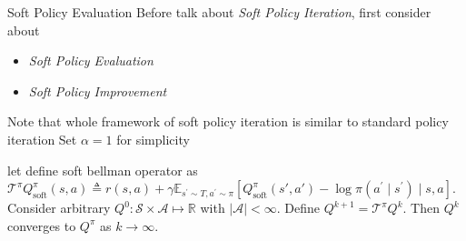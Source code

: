 \documentclass[8pt]{beamer}
\begin{document}
\begin{frame}{Soft Policy Evaluation}
    Before talk about \textit{Soft Policy Iteration}, first consider  about 
    \begin{itemize}
        \item \textit{Soft Policy Evaluation}
        \item \textit{Soft Policy Improvement}
    \end{itemize}
    Note that whole framework of soft policy iteration is similar to standard policy iteration
    \bigskip
    \bigskip
    Set $\alpha=1$ for simplicity
    \begin{theorem}
        let define soft bellman operator as $\mathcal{T}^\pi Q^\pi_{\text{soft}}(s, a) \triangleq r(s,a) + \gamma\mathbb{E}_{s^\prime \sim T, a^\prime \sim \pi}[Q^\pi_{\text{soft}}(s', a') -  \log{\pi(a^\prime \mid s^\prime)} \mid s, a]$. Consider arbitrary $Q^0 : \mathcal{S} \times \mathcal{A} \mapsto \mathbb{R}$ with \(|\mathcal{A}| < \infty \). Define \( Q^{k+1} = \mathcal{T}^\pi Q^k \). Then \(Q^k\) converges to \(Q^\pi \) as \(k \rightarrow \infty \).
    \end{theorem}
\end{frame}
\end{document}
